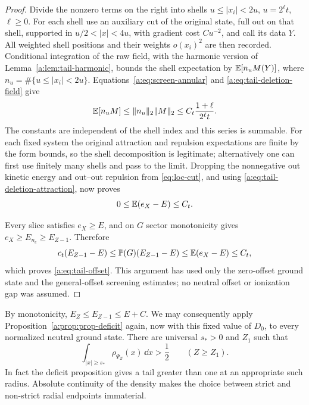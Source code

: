 \begin{proof}
Divide the nonzero terms on the right into shells
$u\le|x_i|<2u$, $u=2^\ell t$, $\ell\ge0$.  For each shell use an
auxiliary cut of the original state, full out on that shell, supported
in $u/2<|x|<4u$, with gradient cost $C u^{-2}$, and call its data $Y$.
All weighted shell positions and their weights $o(x_i)^2$ are then
recorded.  Conditional integration of the raw field, with the harmonic
version of Lemma~\ref{a:lem:tail-harmonic}, bounds the shell expectation
by $\mathbb E[n_u M(Y)]$, where $n_u=\#\{u\le|x_i|<2u\}$.
Equations~\eqref{a:eq:screen-annular} and
\eqref{a:eq:tail-deletion-field} give
\[
 \mathbb E[n_uM]\le\|n_u\|_2\|M\|_2
 \le C_t\frac{1+\ell}{2^\ell t}.
\]
The constants are independent of the shell index and this series is
summable.  For each fixed system the original attraction and
repulsion expectations are finite by the form bounds, so the shell
decomposition is legitimate; alternatively one can first use finitely
many shells and pass to the limit.  Dropping the nonnegative out
kinetic energy and out--out repulsion from
\eqref{eq:loc-cut}, and using
\eqref{a:eq:tail-deletion-attraction}, now proves
\begin{equation}\label{a:eq:tail-deletion-energy}
 0\le\mathbb E(e_X-E)\le C_t.
\end{equation}

Every slice satisfies $e_X\ge E$, and on $G$ sector monotonicity gives
$e_X\ge E_{n_c}\ge E_{Z-1}$.  Therefore
\[
 c_t(E_{Z-1}-E)
 \le\mathbb P(G)(E_{Z-1}-E)
 \le\mathbb E(e_X-E)\le C_t,
\]
which proves \eqref{a:eq:tail-offset}.  This argument has used only the
zero-offset ground state and the general-offset screening estimates;
no neutral offset or ionization gap was assumed.
\end{proof}

By monotonicity, $E_Z\le E_{Z-1}\le E+C$.  We may consequently apply
Proposition~\ref{a:prop:prop-deficit} again, now with this fixed value of
$D_0$, to every normalized neutral ground state.  There are universal
$s_*>0$ and $Z_1$ such that
\begin{equation}\label{a:eq:tail-lower}
 \int_{|x|\ge s_*}\rho_{\Psi_Z}(x)\,\dd x>\frac12
 \qquad (Z\ge Z_1).
\end{equation}
In fact the deficit proposition gives a tail greater than one at an
appropriate such radius.  Absolute continuity of the density makes
the choice between strict and non-strict radial endpoints immaterial.
